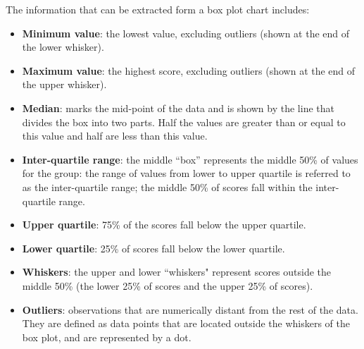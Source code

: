 The information that can be extracted form a box plot chart includes:
\begin{itemize}
    \item \textbf{Minimum value}: the lowest value, excluding outliers (shown at the end of the lower whisker).
    \item \textbf{Maximum value}: the highest score, excluding outliers (shown at the end of the upper whisker).
    \item \textbf{Median}: marks the mid-point of the data and is shown by the line that divides the box into two parts. Half the values are greater than or equal to this value and half are less than this value.
    \item \textbf{Inter-quartile range}: the middle “box” represents the middle 50\% of values for the group: the range of values from lower to upper quartile is referred to as the inter-quartile range; the middle 50\% of scores fall within the inter-quartile range.
    \item \textbf{Upper quartile}: 75\% of the scores fall below the upper quartile.
    \item \textbf{Lower quartile}: 25\% of scores fall below the lower quartile.
    \item \textbf{Whiskers}: the upper and lower ``whiskers" represent scores outside the middle 50\% (\ie the lower 25\% of scores and the upper 25\% of scores).
    \item \textbf{Outliers}: observations that are numerically distant from the rest of the data. They are defined as data points that are located outside the whiskers of the box plot, and are represented by a dot.
\end{itemize}



